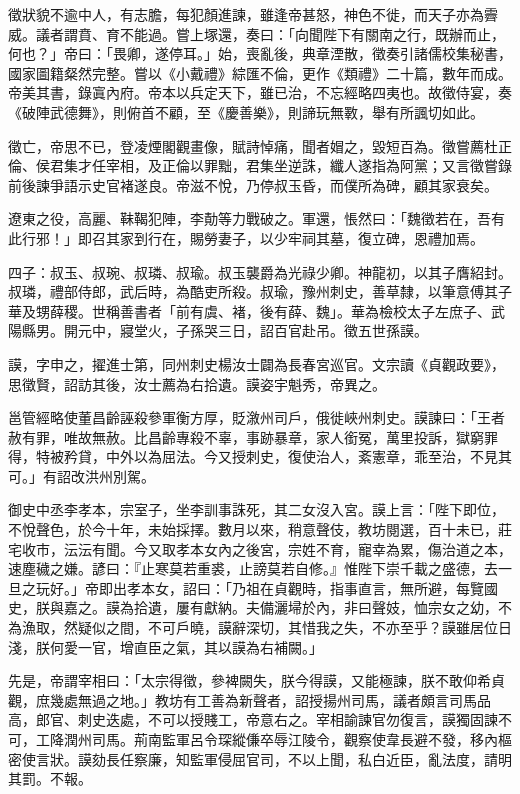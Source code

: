 \begin{pinyinscope}
 徵狀貌不逾中人，有志膽，每犯顏進諫，雖逢帝甚怒，神色不徙，而天子亦為霽威。議者謂賁、育不能過。嘗上塚還，奏曰：「向聞陛下有關南之行，既辦而止，何也？」帝曰：「畏卿，遂停耳。」始，喪亂後，典章湮散，徵奏引諸儒校集秘書，國家圖籍粲然完整。嘗以《小戴禮》綜匯不倫，更作《類禮》二十篇，數年而成。帝美其書，錄寘內府。帝本以兵定天下，雖已治，不忘經略四夷也。故徵侍宴，奏《破陣武德舞》，則俯首不顧，至《慶善樂》，則諦玩無斁，舉有所諷切如此。



 徵亡，帝思不已，登凌煙閣觀畫像，賦詩悼痛，聞者媢之，毀短百為。徵嘗薦杜正倫、侯君集才任宰相，及正倫以罪黜，君集坐逆誅，纖人遂指為阿黨；又言徵嘗錄前後諫爭語示史官褚遂良。帝滋不悅，乃停叔玉昏，而僕所為碑，顧其家衰矣。



 遼東之役，高麗、靺鞨犯陣，李勣等力戰破之。軍還，悵然曰：「魏徵若在，吾有此行邪！」即召其家到行在，賜勞妻子，以少牢祠其墓，復立碑，恩禮加焉。



 四子：叔玉、叔琬、叔璘、叔瑜。叔玉襲爵為光祿少卿。神龍初，以其子膺紹封。叔璘，禮部侍郎，武后時，為酷吏所殺。叔瑜，豫州刺史，善草隸，以筆意傅其子華及甥薛稷。世稱善書者「前有虞、褚，後有薛、魏」。華為檢校太子左庶子、武陽縣男。開元中，寢堂火，子孫哭三日，詔百官赴吊。徵五世孫謨。



 謨，字申之，擢進士第，同州刺史楊汝士闢為長春宮巡官。文宗讀《貞觀政要》，思徵賢，詔訪其後，汝士薦為右拾遺。謨姿宇魁秀，帝異之。



 邕管經略使董昌齡誣殺參軍衡方厚，貶漵州司戶，俄徙峽州刺史。謨諫曰：「王者赦有罪，唯故無赦。比昌齡專殺不辜，事跡暴章，家人銜冤，萬里投訴，獄窮罪得，特被矜貸，中外以為屈法。今又授刺史，復使治人，紊憲章，乖至治，不見其可。」有詔改洪州別駕。



 御史中丞李孝本，宗室子，坐李訓事誅死，其二女沒入宮。謨上言：「陛下即位，不悅聲色，於今十年，未始採擇。數月以來，稍意聲伎，教坊閱選，百十未已，莊宅收市，沄沄有聞。今又取孝本女內之後宮，宗姓不育，寵幸為累，傷治道之本，速塵穢之嫌。諺曰：『止寒莫若重裘，止謗莫若自修。』惟陛下崇千載之盛德，去一旦之玩好。」帝即出孝本女，詔曰：「乃祖在貞觀時，指事直言，無所避，每覽國史，朕與嘉之。謨為拾遺，屢有獻納。夫備灑埽於內，非曰聲妓，恤宗女之幼，不為漁取，然疑似之間，不可戶曉，謨辭深切，其惜我之失，不亦至乎？謨雖居位日淺，朕何愛一官，增直臣之氣，其以謨為右補闕。」



 先是，帝謂宰相曰：「太宗得徵，參裨闕失，朕今得謨，又能極諫，朕不敢仰希貞觀，庶幾處無過之地。」教坊有工善為新聲者，詔授揚州司馬，議者頗言司馬品高，郎官、刺史迭處，不可以授賤工，帝意右之。宰相諭諫官勿復言，謨獨固諫不可，工降潤州司馬。荊南監軍呂令琛縱傔卒辱江陵令，觀察使韋長避不發，移內樞密使言狀。謨劾長任察廉，知監軍侵屈官司，不以上聞，私白近臣，亂法度，請明其罰。不報。




\end{pinyinscope}
